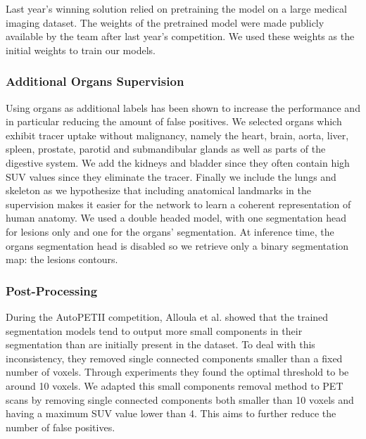 \documentclass[runningheads]{llncs}
\begin{document}
Last year's winning solution relied on pretraining the model on a large medical imaging dataset. The weights of the pretrained model were made publicly available by the team after last year’s competition.
We used these weights as the initial weights to train our models.

\subsubsection{Additional Organs Supervision}
Using organs as additional labels has been shown to increase the performance and in particular reducing the amount of false positives.
We selected organs which exhibit tracer uptake without malignancy, namely the heart, brain, aorta, liver, spleen, prostate, parotid and submandibular glands as well as parts of the digestive system.
We add the kidneys and bladder since they often contain high SUV values since they eliminate the tracer.
Finally we include the lungs and skeleton as we hypothesize that including anatomical landmarks in the supervision makes it easier for the network to learn a coherent representation of human anatomy.
We used a double headed model, with one segmentation head for lesions only and one for the organs' segmentation.
At inference time, the organs segmentation head is disabled so we retrieve only a binary segmentation map: the lesions contours.

\subsubsection{Post-Processing}
During the AutoPETII competition, Alloula et al.\cite{alloula2024autopetchallenge2023nnunetbased} showed that the trained segmentation models tend to output more small components in their segmentation than are initially present in the dataset.
To deal with this inconsistency, they removed single connected components smaller than a fixed number of voxels.
Through experiments they found the optimal threshold to be around 10 voxels.
We adapted this small components removal method to PET scans by removing single connected components both smaller than 10 voxels and having a maximum SUV value lower than 4.
This aims to further reduce the number of false positives.
\end{document}
